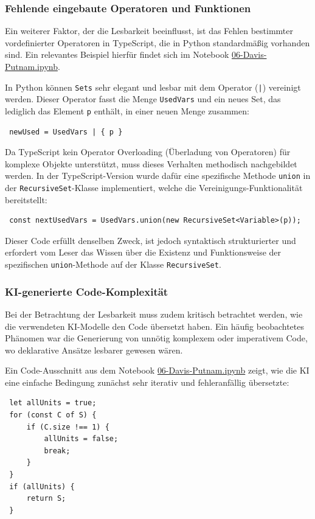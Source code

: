 \subsubsection{Fehlende eingebaute Operatoren und Funktionen}
Ein weiterer Faktor, der die Lesbarkeit beeinflusst, ist das Fehlen bestimmter vordefinierter Operatoren in TypeScript, die in Python standardmäßig vorhanden sind. Ein relevantes Beispiel hierfür findet sich im Notebook \href{https://github.com/zLeoll/TS-Translation-for-TheoInf/blob/main/Logic/Chapter-4/06-Davis-Putnam.ipynb}{06-Davis-Putnam.ipynb}. 

In Python können \texttt{Sets} sehr elegant und lesbar mit dem Operator (\texttt{|}) vereinigt werden. Dieser Operator fasst die Menge \texttt{UsedVars} und ein neues Set, das lediglich das Element \texttt{p} enthält, in einer neuen Menge zusammen:
\begin{verbatim}
 newUsed = UsedVars | { p }
\end{verbatim}

Da TypeScript kein Operator Overloading (Überladung von Operatoren) für komplexe Objekte unterstützt, muss dieses Verhalten methodisch nachgebildet werden. In der TypeScript-Version wurde dafür eine spezifische Methode \texttt{union} in der \texttt{RecursiveSet}-Klasse implementiert, welche die Vereinigungs-Funktionalität bereitstellt:
\begin{verbatim}
 const nextUsedVars = UsedVars.union(new RecursiveSet<Variable>(p));
\end{verbatim}
Dieser Code erfüllt denselben Zweck, ist jedoch syntaktisch strukturierter und erfordert vom Leser das Wissen über die Existenz und Funktionsweise der spezifischen \texttt{union}-Methode auf der Klasse \texttt{RecursiveSet}.

\subsubsection{KI-generierte Code-Komplexität}
Bei der Betrachtung der Lesbarkeit muss zudem kritisch betrachtet werden, wie die verwendeten \ac{KI}-Modelle den Code übersetzt haben. Ein häufig beobachtetes Phänomen war die Generierung von unnötig komplexem oder imperativem Code, wo deklarative Ansätze lesbarer gewesen wären. 

Ein Code-Ausschnitt aus dem Notebook \href{https://github.com/zLeoll/TS-Translation-for-TheoInf/blob/main/Logic/Chapter-4/06-Davis-Putnam.ipynb}{06-Davis-Putnam.ipynb} zeigt, wie die \ac{KI} eine einfache Bedingung zunächst sehr iterativ und fehleranfällig übersetzte:
\begin{verbatim}
 let allUnits = true;
 for (const C of S) {
     if (C.size !== 1) {
         allUnits = false;
	     break;
     }
 }
 if (allUnits) {
     return S;
 }
\end{verbatim}

